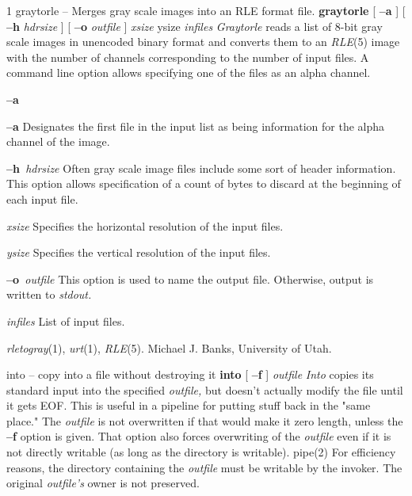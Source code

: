 %
%
%
 1
graytorle -- Merges gray scale images into an RLE format file.
{\bf graytorle} 
[
{\bf --a}
] [
{\bf --h}
{\it hdrsize}
] [
{\bf --o}
{\it outfile}
] 
{\it xsize} ysize
{\it infiles}
{\it Graytorle}
reads a list of 8-bit gray scale images in unencoded binary format and converts
them to an
{\it RLE}{\rm (5)}
image with the number of channels corresponding to the number of input files.
A command line option allows specifying one of the files as an alpha channel.
\begin{TPlist}{{\bf --a}}
\item[{{\bf --a}}]
Designates the first file in the input list as being information for the
alpha channel of the image.
\item[{{\bf --h}{\it \ hdrsize}
}]
Often gray scale image files include some sort of header information.  This
option allows specification of a count of bytes to discard at the beginning
of each input file.
\item[{{\it xsize}}]
Specifies the horizontal resolution of the input files.
\item[{{\it ysize}}]
Specifies the vertical resolution of the input files.
\item[{{\bf --o}{\it \ outfile}
}]
This option is used to name the output file.  Otherwise, output is written
to
{\it stdout.}
\item[{{\it infiles}}]
List of input files.
\end{TPlist}
{\it rletogray}{\rm (1),}
{\it urt}{\rm (1),}
{\it RLE}{\rm (5).}
Michael J. Banks, University of Utah.


\newpage


%
%
%

into -- copy into a file without destroying it
{\bf into}
[
{\bf --f}
] 
{\it outfile}
{\it Into}
copies its standard input into the specified
{\it outfile,}
but doesn't actually modify the file
until it gets EOF.
This is useful in a pipeline for putting stuff back in the "same place."
The
{\it outfile}
is not overwritten if that would make it zero length, unless
the
{\bf --f}
option is given.  That option also
forces overwriting of the
{\it outfile}
even if it is not directly writable (as long as the directory is writable).
pipe(2)
For efficiency reasons, the directory containing the
{\it outfile}
must be writable by the invoker.
\nwl
The original
{\it outfile's}
owner is not preserved.
\newpage


